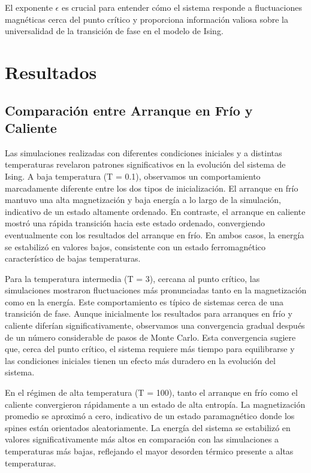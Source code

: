 \documentclass[twocolumn]{article}
\begin{document}
El exponente $\epsilon$ es crucial para entender cómo el sistema responde a fluctuaciones magnéticas cerca del punto crítico y proporciona información valiosa sobre la universalidad de la transición de fase en el modelo de Ising.






\section{Resultados}

\subsection*{Comparación entre Arranque en Frío y Caliente}

Las simulaciones realizadas con diferentes condiciones iniciales y a distintas temperaturas revelaron patrones significativos en la evolución del sistema de Ising. A baja temperatura (T = 0.1), observamos un comportamiento marcadamente diferente entre los dos tipos de inicialización. El arranque en frío mantuvo una alta magnetización y baja energía a lo largo de la simulación, indicativo de un estado altamente ordenado. En contraste, el arranque en caliente mostró una rápida transición hacia este estado ordenado, convergiendo eventualmente con los resultados del arranque en frío. En ambos casos, la energía se estabilizó en valores bajos, consistente con un estado ferromagnético característico de bajas temperaturas.

Para la temperatura intermedia (T = 3), cercana al punto crítico, las simulaciones mostraron fluctuaciones más pronunciadas tanto en la magnetización como en la energía. Este comportamiento es típico de sistemas cerca de una transición de fase. Aunque inicialmente los resultados para arranques en frío y caliente diferían significativamente, observamos una convergencia gradual después de un número considerable de pasos de Monte Carlo. Esta convergencia sugiere que, cerca del punto crítico, el sistema requiere más tiempo para equilibrarse y las condiciones iniciales tienen un efecto más duradero en la evolución del sistema.

En el régimen de alta temperatura (T = 100), tanto el arranque en frío como el caliente convergieron rápidamente a un estado de alta entropía. La magnetización promedio se aproximó a cero, indicativo de un estado paramagnético donde los spines están orientados aleatoriamente. La energía del sistema se estabilizó en valores significativamente más altos en comparación con las simulaciones a temperaturas más bajas, reflejando el mayor desorden térmico presente a altas temperaturas.
\end{document}
